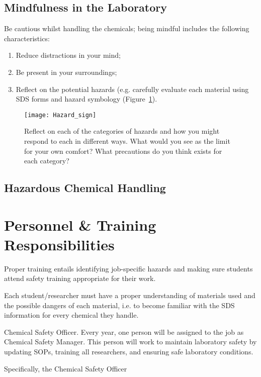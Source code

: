 \documentclass[12pt]{../SOP4_alpha}\usepackage[]{graphicx}\usepackage[]{color}
\begin{document}
\subsection{Mindfulness in the Laboratory}

Be cautious whilst handling the chemicals; being mindful includes the following characteristics: 

\begin{enumerate}
  \item Reduce distractions in your mind;
  \item Be present in your surroundings;
  \item Reflect on the potential hazards (e.g. carefully evaluate each material using SDS forms and hazard symbology (Figure~\ref{fig:hazard_sign}).
\end{enumerate}

\begin{figure}
  \texttt{[image: Hazard\_sign]}
  \label{fig:hazard_sign}
  \caption{Reflect on each of the categories of hazards and how you might respond to each in different ways. What would you see as the limit for your own comfort?  What precautions do you think exists for each category?}
\end{figure}

\subsection{Hazardous Chemical Handling}

\section{Personnel \& Training Responsibilities}

\NP Proper training entails identifying job-specific hazards and making sure students attend safety training appropriate for their work. 

\NP Each student/researcher must have a proper understanding of materials used and the possible dangers of each material, i.e. to become familiar with the SDS information for every chemical they handle.

\NP Chemical Safety Officer. Every year, one person will be assigned to the job as Chemical Safety Manager. This person will work to maintain laboratory safety by updating SOPs, training all researchers, and ensuring safe laboratory conditions.

\NP Specifically, the Chemical Safety Officer 
\end{document}
